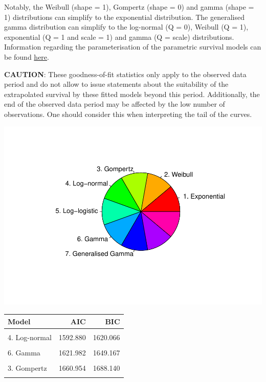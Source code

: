 \documentclass[
]{article}
\begin{document}
Notably, the Weibull (shape = 1), Gompertz (shape = 0) and gamma (shape
= 1) distributions can simplify to the exponential distribution. The
generalised gamma distribution can simplify to the log-normal (Q = 0),
Weibull (Q = 1), exponential (Q = 1 and scale = 1) and gamma (Q = scale)
distributions. Information regarding the parameterisation of the
parametric survival models can be found
\href{https://devinincerti.com/code/survival-distributions.html}{here}.

\textbf{CAUTION}: These goodness-of-fit statistics only apply to the
observed data period and do not allow to issue statements about the
suitability of the extrapolated survival by these fitted models beyond
this period. Additionally, the end of the observed data period may be
affected by the low number of observations. One should consider this
when interpreting the tail of the curves.

\begin{flushleft}\includegraphics{Images/plot_parametric-1} \end{flushleft}

\begin{table}
\centering
\begin{tabular}{lrr}
\toprule
Model & AIC & BIC\\
\midrule
\cellcolor{gray!6}{7. Generalised Gamma} & \cellcolor{gray!6}{1589.049} & \cellcolor{gray!6}{1629.826}\\
4. Log-normal & 1592.880 & 1620.066\\
\cellcolor{gray!6}{5. Log-logistic} & \cellcolor{gray!6}{1609.294} & \cellcolor{gray!6}{1636.479}\\
6. Gamma & 1621.982 & 1649.167\\
\cellcolor{gray!6}{2. Weibull} & \cellcolor{gray!6}{1632.618} & \cellcolor{gray!6}{1659.803}\\
3. Gompertz & 1660.954 & 1688.140\\
\cellcolor{gray!6}{1. Exponential} & \cellcolor{gray!6}{1668.212} & \cellcolor{gray!6}{1681.805}\\
\bottomrule
\end{tabular}
\end{table}
\end{document}
